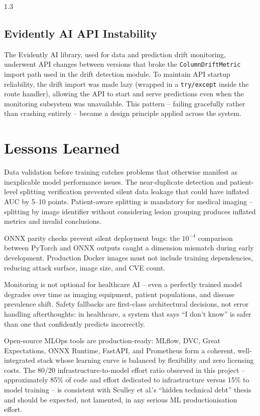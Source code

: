 \begin{spacing}{1.3}
\subsection{Evidently AI API Instability}

The Evidently AI library, used for data and prediction drift monitoring, underwent API changes between versions that broke the \texttt{ColumnDriftMetric} import path used in the drift detection module. To maintain API startup reliability, the drift import was made lazy (wrapped in a \texttt{try/except} inside the route handler), allowing the API to start and serve predictions even when the monitoring subsystem was unavailable. This pattern -- failing gracefully rather than crashing entirely -- became a design principle applied across the system.

\section{Lessons Learned}

Data validation before training catches problems that otherwise manifest as inexplicable model performance issues. The near-duplicate detection and patient-level splitting verification prevented silent data leakage that could have inflated AUC by 5--10 points. Patient-aware splitting is mandatory for medical imaging -- splitting by image identifier without considering lesion grouping produces inflated metrics and invalid conclusions.

ONNX parity checks prevent silent deployment bugs: the $10^{-4}$ comparison between PyTorch and ONNX outputs caught a dimension mismatch during early development. Production Docker images must not include training dependencies, reducing attack surface, image size, and CVE count.

Monitoring is not optional for healthcare AI -- even a perfectly trained model degrades over time as imaging equipment, patient populations, and disease prevalence shift. Safety fallbacks are first-class architectural decisions, not error handling afterthoughts: in healthcare, a system that says ``I don't know'' is safer than one that confidently predicts incorrectly.

Open-source MLOps tools are production-ready: MLflow, DVC, Great Expectations, ONNX Runtime, FastAPI, and Prometheus form a coherent, well-integrated stack whose learning curve is balanced by flexibility and zero licensing costs. The 80/20 infrastructure-to-model effort ratio observed in this project -- approximately 85\% of code and effort dedicated to infrastructure versus 15\% to model training -- is consistent with Sculley et al.'s ``hidden technical debt'' thesis and should be expected, not lamented, in any serious ML productionisation effort.

\end{spacing}
